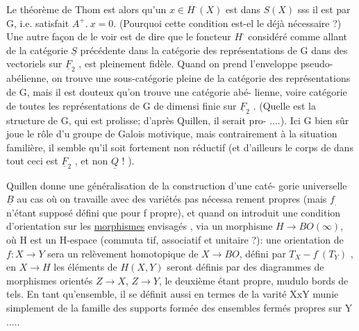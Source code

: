 
Le théorème de Thom est alors qu'un $x \in H^{\cdot}(X)$ est dans $S(X)$ sss il est
 par G, i.e. satisfait $A^{+}.\ x = 0$. (Pourquoi cette condition est-el%
le déjà nécessaire ?) Une autre façon de le voir est de dire que le
foncteur $H^{\cdot}$ considéré comme allant de la catégorie $\underline{S}$ précédente dans
la catégorie des  représentations de G dans des vectoriels
sur $\underline{F}_2$ , est pleinement fidèle.  Quand on prend l'enveloppe
pseudo-abélienne, on trouve une sous-catégorie pleine de la catégorie des
représentations de G, mais il est douteux qu'on trouve une catégorie abé-%
lienne, voire  catégorie de toutes les représentations de G de dimensi
finie sur $\underline{F}_2$ . (Quelle est la structure de G, qui est prolisse; d'après
Quillen, il serait pro- ....). Ici G bien sûr joue le rôle d'u
groupe de Galois motivique, mais contrairement à la situation familière,
il semble qu'il soit fortement non réductif (et d'ailleurs le corps de
\hand{$\triangleright$}  dans tout ceci est $\underline{F}_2$ , et non $\underline{Q}$ ! ).

Quillen donne une généralisation de la construction d'une caté-%
gorie universelle $\underline{B}$ au cas où on travaille avec des variétés pas nécessa
rement propres (mais $f_{.}$ n'étant supposé défini que pour f propre), et
quand on introduit une condition d'orientation  sur les \uline{morphismes}
envisagés , via un morphisme $H \to BO(\infty)$, où H est un H-espace (commuta
tif, associatif et unitaire ?): une orientation de $f:X \to Y$ sera un
relèvement homotopique de $X \to BO$, défini par  $T_X - f^{\cdot}(T_Y)$ , en $X \to H$
les éléments de $H(X,Y)$ seront définis par des diagrammes de morphismes
orientés $Z \to X$, $Z \to Y$, le deuxième étant propre, mudulo bords de tels.
En tant qu'ensemble, il se définit aussi en termes de la varité XxY
munie simplement de la famille des supports formée des ensembles fermés
propres sur Y ..... 


